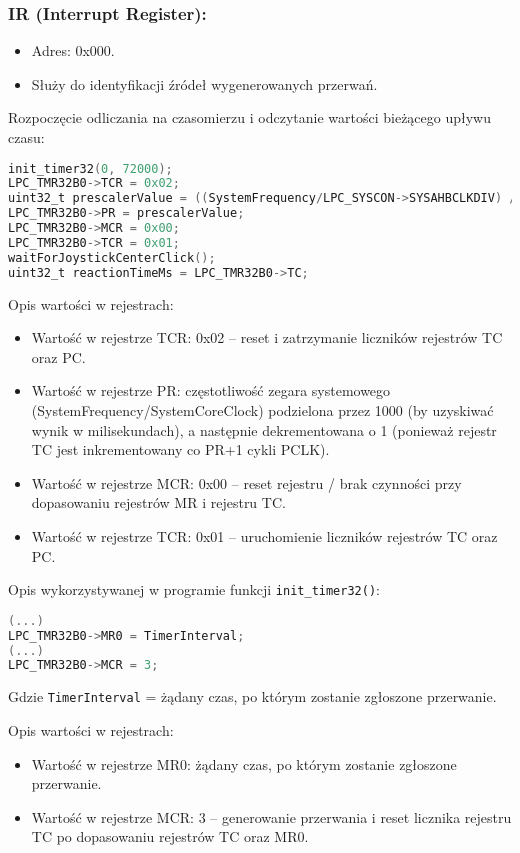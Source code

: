 \documentclass[a4paper,12pt]{report}
\begin{document}
\subsubsection*{IR (Interrupt Register):}
\begin{itemize}
    \item Adres: 0x000.
    \item Służy do identyfikacji źródeł wygenerowanych przerwań.
\end{itemize}

Rozpoczęcie odliczania na czasomierzu i odczytanie wartości bieżącego upływu czasu:
\begin{lstlisting}[language=C]
init_timer32(0, 72000);
LPC_TMR32B0->TCR = 0x02;
uint32_t prescalerValue = ((SystemFrequency/LPC_SYSCON->SYSAHBCLKDIV) / 1000) - 1;
LPC_TMR32B0->PR = prescalerValue;
LPC_TMR32B0->MCR = 0x00;
LPC_TMR32B0->TCR = 0x01;
waitForJoystickCenterClick();
uint32_t reactionTimeMs = LPC_TMR32B0->TC;
\end{lstlisting}

Opis wartości w rejestrach:
\begin{itemize}
    \item Wartość w rejestrze TCR: 0x02 – reset i zatrzymanie liczników rejestrów TC oraz PC.
    \item Wartość w rejestrze PR: częstotliwość zegara systemowego (SystemFrequency/SystemCoreClock) podzielona przez 1000 (by uzyskiwać wynik w milisekundach), a następnie dekrementowana o 1 (ponieważ rejestr TC jest inkrementowany co PR+1 cykli PCLK).
    \item Wartość w rejestrze MCR: 0x00 – reset rejestru / brak czynności przy dopasowaniu rejestrów MR i rejestru TC.
    \item Wartość w rejestrze TCR: 0x01 – uruchomienie liczników rejestrów TC oraz PC.
\end{itemize}

Opis wykorzystywanej w programie funkcji \texttt{init\_timer32()}:
\begin{lstlisting}[language=C]
(...)
LPC_TMR32B0->MR0 = TimerInterval;
(...)
LPC_TMR32B0->MCR = 3;
\end{lstlisting}
Gdzie \texttt{TimerInterval} = żądany czas, po którym zostanie zgłoszone przerwanie.

Opis wartości w rejestrach:
\begin{itemize}
    \item Wartość w rejestrze MR0: żądany czas, po którym zostanie zgłoszone przerwanie.
    \item Wartość w rejestrze MCR: 3 – generowanie przerwania i reset licznika rejestru TC po dopasowaniu rejestrów TC oraz MR0.
\end{itemize}
\end{document}

